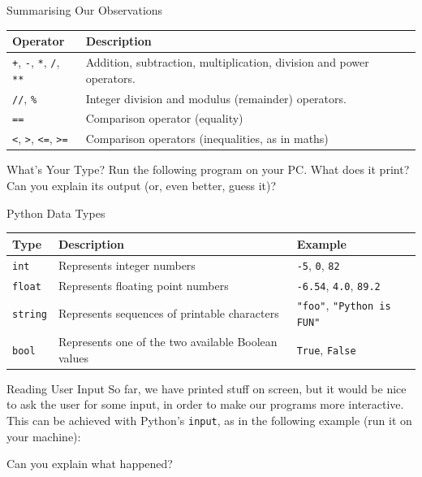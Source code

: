 \documentclass[aspectratio=169, 12pt, xcolor=table]{beamer}
\begin{document}
	\begin{frame}{Summarising Our Observations}
		\centering
		\begin{tabular}{lp{}}
			\toprule%
			\textbf{Operator} & \textbf{Description} \\\midrule
			\texttt{+}, \texttt{-}, \texttt{*}, \texttt{/}, \texttt{**} & Addition, subtraction, multiplication, division and power operators.\\%
			\texttt{//}, \texttt{\%} & Integer division and modulus (remainder) operators.\\
			\texttt{==} & Comparison operator (equality)\\%
			\texttt{<}, \texttt{>}, \texttt{<=}, \texttt{>=} & Comparison operators (inequalities, as in maths)\\%
			\bottomrule
		\end{tabular}
	\end{frame}

	\begin{frame}{What's Your Type?}
		Run the following program on your PC. What does it print? Can you explain its output (or, even better, guess it)?
		
	\end{frame}

	\begin{frame}{Python Data Types}
		\centering
		\begin{tabular}{lp{}l}
			\toprule%
			\textbf{Type} & \textbf{Description} & \textbf{Example}\\\midrule%
			\texttt{int} & Represents integer numbers & \texttt{-5}, \texttt{0}, \texttt{82}\\%
			\texttt{float} & Represents floating point numbers & \texttt{-6.54}, \texttt{4.0}, \texttt{89.2}\\%
			\texttt{string} & Represents sequences of printable characters & \texttt{"foo"}, \texttt{"Python is FUN"}\\%
			\texttt{bool} & Represents one of the two available Boolean values & \texttt{True}, \texttt{False}\\%
			\bottomrule
		\end{tabular}
	\end{frame}

	\begin{frame}{Reading User Input}
		So far, we have printed stuff on screen, but it would be nice to ask the user for some input, in order to make our programs more interactive. This can be achieved with Python's \texttt{input}, as in the following example (run it on your machine):
		
		Can you explain what happened?
	\end{frame}
\end{document}
